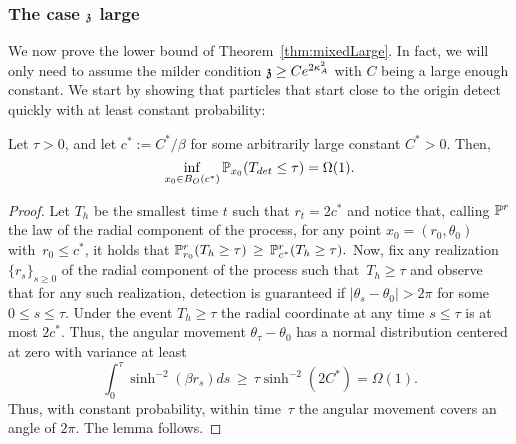 \subsubsection{The case $\ss$ large}
We now prove the lower bound of Theorem~\ref{thm:mixedLarge}. In fact, we will only need to assume the milder condition $\ss \ge Ce^{2\KA^2}$ with $C$ being a large enough constant. %
We start by showing that particles that start close to the origin detect quickly with at least constant probability:
\begin{lemma}\label{lem:closetoorigin}
Let $\tau > 0$, and let $c^*:=C^*/\beta$ for some arbitrarily large constant $C^* > 0$. Then,
$$
 \inf_{x_0\in B_O(c^*)}\PP_{x_0}(T_{det}\leq \tau)=\Omega(1).
$$
\end{lemma}
\begin{proof}
Let $T_{h}$ be the smallest time $t$ such that $r_t=2c^*$ and notice that, calling $\PP^r$ the law of the radial component of the process, for any point $x_0=(r_0, \theta_0)$ with~$r_0 \le c^*$, it holds that
$\PP^r_{r_0}(T_{h}\ge \tau)\,\geq\,\PP^r_{c^*}(T_{h} \ge \tau).$
Now, fix any realization $\{r_s\}_{s\geq 0}$ of the radial component of the process such that~$T_h\ge\tau $ and observe that for any such realization, detection is guaranteed if $|\theta_s-\theta_0|>2\pi$ for some $0 \le s \le \tau$. Under the event $T_{h}\ge\tau$ the radial coordinate at any time $s \le \tau$ is at most $2c^*$. Thus, the angular movement $\theta_\tau-\theta_0$ has a normal distribution centered at zero with variance at least
\[\int_0^{\tau}\sinh^{-2}(\beta r_s)ds\,\geq\, \tau\sinh^{-2}(2C^*)  =\Omega(1).\]
Thus, with constant probability, within time~$\tau$ the angular movement covers an angle of $2\pi$. The lemma follows. 
\end{proof}


